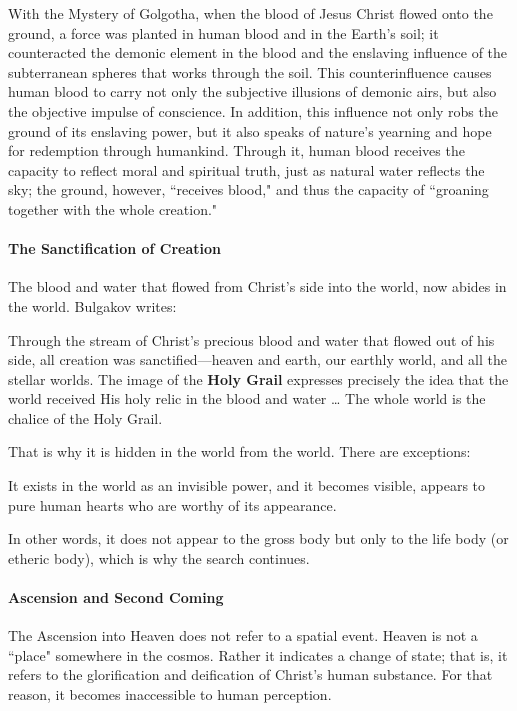 \begin{quotex}
With the Mystery of Golgotha, when the blood of Jesus Christ flowed onto the ground, a force was planted in human blood and in the Earth's soil; it counteracted the demonic element in the blood and the enslaving influence of the subterranean spheres that works through the soil. This counterinfluence causes human blood to carry not only the subjective illusions of demonic airs, but also the objective impulse of conscience. In addition, this influence not only robs the ground of its enslaving power, but it also speaks of nature's yearning and hope for redemption through humankind. Through it, human blood receives the capacity to reflect moral and spiritual truth, just as natural water reflects the sky; the ground, however, ``receives blood," and thus the capacity of ``groaning together with the whole creation." 

\end{quotex}
\paragraph{The Sanctification of Creation}
The blood and water that flowed from Christ's side into the world, now abides in the world. Bulgakov writes:

Through the stream of Christ's precious blood and water that flowed out of his side, all creation was sanctified—heaven and earth, our earthly world, and all the stellar worlds. The image of the \textbf{Holy Grail} expresses precisely the idea that the world received His holy relic in the blood and water … The whole world is the chalice of the Holy Grail.

That is why it is hidden in the world from the world. There are exceptions:

\begin{quotex}
It exists in the world as an invisible power, and it becomes visible, appears to pure human hearts who are worthy of its appearance.

\end{quotex}
In other words, it does not appear to the gross body but only to the life body (or etheric body), which is why the search continues.

\paragraph{Ascension and Second Coming}
The Ascension into Heaven does not refer to a spatial event. Heaven is not a ``place" somewhere in the cosmos. Rather it indicates a change of state; that is, it refers to the glorification and deification of Christ's human substance. For that reason, it becomes inaccessible to human perception.

